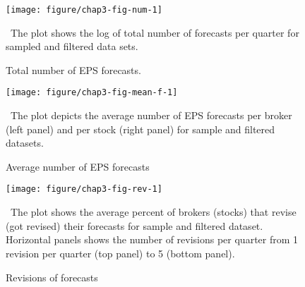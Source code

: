 \begin{figure}
\begin{knitrout}
\color{fgcolor}
\texttt{[image: figure/chap3-fig-num-1]} 

\end{knitrout}
\caption{Total number of EPS forecasts.}
\ The plot shows the log of total number of forecasts per quarter for sampled and filtered data sets.
\label{ch3-fig:tot}
\end{figure}

\begin{figure}
\begin{knitrout}
\color{fgcolor}
\texttt{[image: figure/chap3-fig-mean-f-1]} 

\end{knitrout}
\caption{Average number of EPS forecasts}
\ The plot depicts the average number of EPS forecasts per broker (left panel) and per stock (right panel) for sample and filtered datasets.
\label{ch3-fig:mean-f}
\end{figure}

%
%
%

\begin{figure}
\begin{knitrout}
\color{fgcolor}
\texttt{[image: figure/chap3-fig-rev-1]} 

\end{knitrout}
\caption{Revisions of forecasts}
\ The plot shows the average percent of brokers (stocks) that revise (got revised) their forecasts for sample and filtered dataset. Horizontal panels shows the number of revisions per quarter from 1 revision per quarter (top panel) to 5 (bottom panel).
\label{ch3-fig:rev}
\end{figure}

